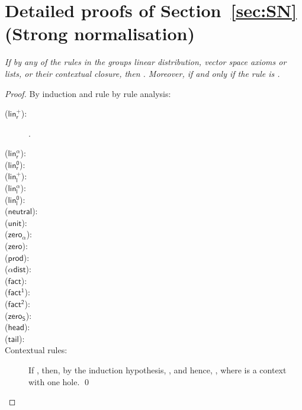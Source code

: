\documentclass[preprint]{elsarticle}
\newcommand\recap[3]{\noindent {\bf #1 \ref{#2}.} \emph{#3}}
\newcommand\s[1]{\ensuremath{\mathsf{#1}}}
\newcommand\rlinr{(\s{lin^+_r})}
\newcommand\rlinscalr{(\s{lin^\alpha_r})}
\newcommand\rlinzr{(\s{lin^0_r})}
\newcommand\rlinl{(\s{lin^+_l})}
\newcommand\rlinscall{(\s{lin^\alpha_l})}
\newcommand\rlinzl{(\s{lin^0_l})}
\newcommand\rneut{(\s{neutral})}
\newcommand\runit{(\s{unit})}
\newcommand\rzeros{(\s{zero_\alpha})}
\newcommand\rzero{(\s{zero})}
\newcommand\rzeroS{(\s{zero_S})}
\newcommand\rprod{(\s{prod})}
\newcommand\rdists{(\s{\alpha dist})}
\newcommand\rfact{(\s{fact})}
\newcommand\rfacto{(\s{fact^1})}
\newcommand\rfactt{(\s{fact^2})}
\newcommand\rhead{(\s{head})}
\newcommand\rtail{(\s{tail})}
\begin{document}
\section{Detailed proofs of Section~\ref{sec:SN} (Strong normalisation)}\label{ap:SN}
\recap{Lemma}{lem:size}{
  If  by any of the rules in the groups linear distribution,
  vector space axioms or lists, or their contextual closure, then . Moreover,  if and only if the rule is .
}
\begin{proof}
  By induction and rule by rule analysis:
 \begin{description}
 \item[\rlinr:] .
   
 \item[\rlinscalr:] 
   
 \item[\rlinzr:] 
   
 \item[\rlinl:] 
   
 \item[\rlinscall:] 
   
 \item[\rlinzl:] 
   
 \item[\rneut:] 
   
 \item[\runit:] 
   
 \item[\rzeros:] 
   
 \item[\rzero:] 
   
 \item[\rprod:] 
   
 \item[\rdists:] 
   
 \item[\rfact:] 
   
 \item[\rfacto:] 
   
 \item[\rfactt:] 
   
 \item[\rzeroS:] 
   

 \item[\rhead:] 
   
 \item[\rtail:] 
   
 \item[Contextual rules:] If , then, by the induction hypothesis,
   , and hence, , where  is
   a context with one hole.
    \qed
  \end{description}
\end{proof}
\end{document}
